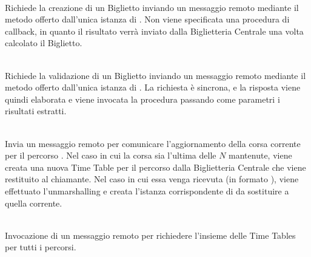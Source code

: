 		\begin{description}
			\item {} \\
				
			Richiede la creazione di un Biglietto inviando un messaggio remoto mediante il metodo  offerto dall'unica istanza di . Non viene specificata una procedura di callback, in quanto il risultato verrà inviato dalla Biglietteria Centrale una volta calcolato il Biglietto.
			
			\item {}\\
				
			Richiede la validazione di un Biglietto inviando un messaggio remoto mediante il metodo  offerto dall'unica istanza di . La richiesta è sincrona, e la risposta viene quindi elaborata e viene invocata la procedura  passando come parametri i risultati estratti.
			
			\item {}\\ 
				
			Invia un messaggio remoto per comunicare l'aggiornamento della corsa corrente  per il percorso . Nel caso in cui la corsa sia l'ultima delle $N$ mantenute, viene creata una nuova Time Table per il percorso  dalla Biglietteria Centrale che viene restituito al chiamante. Nel caso in cui essa venga ricevuta (in formato ), viene effettuato l'unmarshalling e creata l'istanza corrispondente di  da sostituire a quella corrente.
			
			\item {}\\
			Invocazione di un messaggio remoto per richiedere l'insieme delle Time Tables per tutti i percorsi.
				
		\end{description}
	
